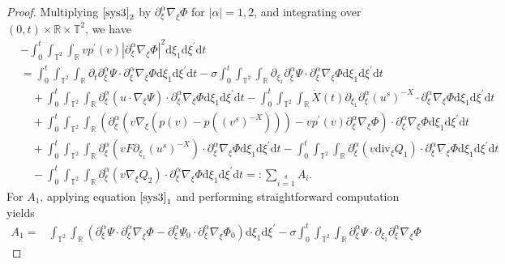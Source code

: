 \documentclass[10pt,a4paper]{amsart}
\newcommand{\ddiv}{\mathrm{div}}
\newcommand{\dif}{\mathrm{d}}
\begin{document}
\begin{proof}
Multiplying $\eqref{sys3}_2$ by $\partial_\xi^\alpha\nabla_\xi\Phi$ for $|\alpha|=1, 2$, and integrating over $(0, t)\times\mathbb{R}\times\mathbb{T}^2$, we have
\begin{align*}
&-\int_0^t\int_{\mathbb{T}^2}\int_{\mathbb{R}}vp^\prime(v)|\partial_\xi^\alpha\nabla_\xi\Phi|^2
\dif \xi_1\dif \xi^{\prime}\dif t\\
&=\int_0^t\int_{\mathbb{T}^2}\int_{\mathbb{R}}\partial_t\partial_\xi^\alpha\Psi\cdot\partial_\xi^\alpha\nabla_\xi\Phi
\dif \xi_1\dif \xi^{\prime}\dif t
-\sigma\int_0^t\int_{\mathbb{T}^2}\int_{\mathbb{R}}\partial_{\xi_1}\partial_\xi^\alpha\Psi\cdot\partial_\xi^\alpha\nabla_\xi\Phi
\dif \xi_1\dif \xi^{\prime}\dif t\\
&\quad+\int_0^t\int_{\mathbb{T}^2}\int_{\mathbb{R}}\partial_\xi^\alpha\left( u\cdot\nabla_\xi\Psi\right)\cdot\partial_\xi^\alpha\nabla_\xi\Phi
\dif \xi_1\dif \xi^{\prime}\dif t
-\int_0^t\int_{\mathbb{T}^2}\int_{\mathbb{R}}\dot{X}(t)\partial_{\xi_1}\partial_\xi^\alpha(u^s)^{-X}\cdot\partial_\xi^\alpha\nabla_\xi\Phi
\dif \xi_1\dif \xi^{\prime}\dif t\\
&\quad+\int_0^t\int_{\mathbb{T}^2}\int_{\mathbb{R}}
\left(\partial_\xi^\alpha\left(v\nabla_\xi\left(p(v)-p((v^s)^{-X})\right)\right)-vp^\prime(v)\partial_\xi^\alpha\nabla_\xi\Phi\right)\cdot\partial_\xi^\alpha\nabla_\xi\Phi
\dif \xi_1\dif \xi^{\prime}\dif t\\
&\quad+\int_0^t\int_{\mathbb{T}^2}\int_{\mathbb{R}}\partial_\xi^\alpha\left(vF\partial_{\xi_1}(u^s)^{-X}\right)\cdot\partial_\xi^\alpha\nabla_\xi\Phi
\dif \xi_1\dif \xi^{\prime}\dif t
-\int_0^t\int_{\mathbb{T}^2}\int_{\mathbb{R}}\partial_\xi^\alpha\left(v\ddiv_\xi Q_1\right)\cdot\partial_\xi^\alpha\nabla_\xi\Phi
\dif \xi_1\dif \xi^{\prime}\dif t\\
&\quad
-\int_0^t\int_{\mathbb{T}^2}\int_{\mathbb{R}}\partial_\xi^\alpha\left(v\nabla_\xi Q_2\right)\cdot\partial_\xi^\alpha\nabla_\xi\Phi
\dif \xi_1\dif \xi^{\prime}\dif t=:\sum\limits_{i=1}\limits^8A_i.
\end{align*}
For $A_1$, applying equation $\eqref{sys3}_1$ and performing straightforward computation yields
\begin{align*}
A_1=&\int_{\mathbb{T}^2}\int_{\mathbb{R}}\left(\partial_\xi^\alpha\Psi\cdot\partial_\xi^\alpha\nabla_\xi\Phi
-\partial_\xi^\alpha\Psi_0\cdot\partial_\xi^\alpha\nabla_\xi\Phi_0\right)
\dif \xi_1\dif \xi^{\prime}
-\sigma\int_0^t\int_{\mathbb{T}^2}\int_{\mathbb{R}}
\partial_\xi^\alpha\Psi\cdot\partial_{\xi_1}\partial_\xi^\alpha\nabla_\xi\Phi

\end{align*}
\end{proof}
\end{document}
